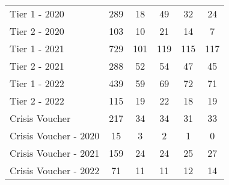 \begin{tabular}{l|c|c|c|c|c}
\midrule 
\quad Tier 1 - 2020 & 289 & 18 & 49 & 32 & 24 \\
\quad Tier 2 - 2020 & 103 & 10 & 21 & 14 & 7 \\
\quad Tier 1 - 2021 & 729 & 101 & 119 & 115 & 117 \\
\quad Tier 2 - 2021 & 288 & 52 & 54 & 47 & 45 \\
\quad Tier 1 - 2022 & 439 & 59 & 69 & 72 & 71 \\
\quad Tier 2 - 2022 & 115 & 19 & 22 & 18 & 19 \\
\midrule 
Crisis Voucher & 217 & 34 & 34 & 31 & 33 \\
\quad Crisis Voucher - 2020 & 15 & 3 & 2 & 1 & 0 \\
\quad Crisis Voucher - 2021 & 159 & 24 & 24 & 25 & 27 \\
\quad Crisis Voucher - 2022 & 71 & 11 & 11 & 12 & 14 \\
\midrule 
\bottomrule 
\end{tabular}
